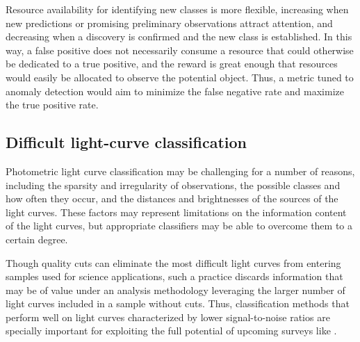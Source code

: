 Resource availability for identifying new classes is more flexible, increasing when new predictions or promising preliminary observations attract attention, and decreasing when a discovery is confirmed and the new class is established.
In this way, a false positive does not necessarily consume a resource that could otherwise be dedicated to a true positive, and the reward is great enough that resources would easily be allocated to observe the potential object.
Thus, a metric tuned to anomaly detection would aim to minimize the false negative rate and maximize the true positive rate.

%


\subsection{Difficult light-curve classification}
\label{sec:difficult}

Photometric light curve classification may be challenging for a number of reasons, including the sparsity and irregularity of observations, the possible classes and how often they occur, and the distances and brightnesses of the sources of the light curves.
These factors may represent limitations on the information content of the light curves, but appropriate classifiers may be able to overcome them to a certain degree.

Though quality cuts can eliminate the most difficult light curves from entering samples used for science applications, such a practice discards information that may be of value under an analysis methodology leveraging the larger number of light curves included in a sample without cuts.
Thus, classification methods that perform well on light curves characterized by lower signal-to-noise ratios are specially important for exploiting the full potential of upcoming surveys like \lsst.

